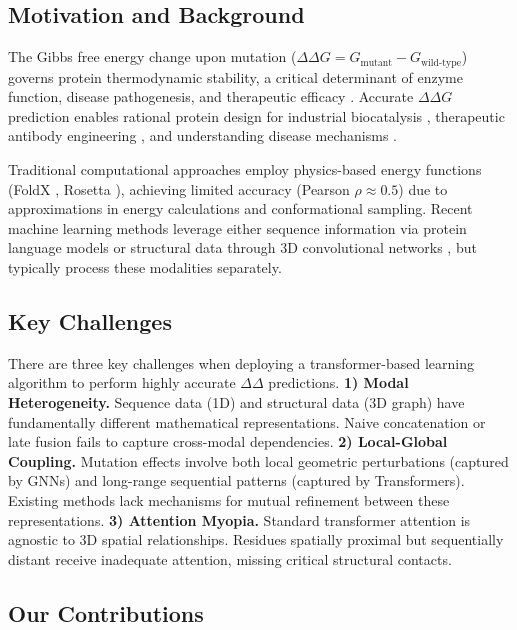\documentclass[11pt]{article}
\begin{document}
\subsection*{Motivation and Background}

The Gibbs free energy change upon mutation ($\Delta\Delta G = G_{\text{mutant}} -
G_{\text{wild-type}}$) governs protein thermodynamic stability, a critical
determinant of enzyme function, disease pathogenesis, and therapeutic efficacy
\cite{tokuriki2009stability}. Accurate $\Delta \Delta G$ prediction enables rational
protein design for industrial biocatalysis \cite{Braun2024,Braun2024.08.02.606416,Listov2025},
therapeutic antibody engineering \cite{Jain2017}, and understanding
disease mechanisms \cite{Yue2005,Bashour2024}.

Traditional computational approaches employ physics-based energy functions
(FoldX \citep{Schymkowitz2005}, Rosetta \citep{Kellogg2011}), achieving
limited accuracy (Pearson $\rho \approx 0.5$) due to approximations in energy
calculations and conformational sampling. Recent machine learning methods
leverage either sequence information via protein language models
\citep{NEURIPS2021_f51338d7} or structural data through 3D convolutional networks
\citep{Zhou2023}, but typically process these modalities separately.

\subsection*{Key Challenges}
There are three key challenges when deploying a transformer-based learning
algorithm to perform highly accurate $\Delta\Delta$ predictions. \textbf{1)
Modal Heterogeneity.} Sequence data (1D) and structural data (3D graph) have
fundamentally different mathematical representations. Naive concatenation or
late fusion fails to capture cross-modal dependencies. \textbf{2) Local-Global
Coupling.} Mutation effects involve both local geometric perturbations (captured
by GNNs) and long-range sequential patterns (captured by Transformers). Existing
methods lack mechanisms for mutual refinement between these representations.
\textbf{3) Attention Myopia.} Standard transformer attention is agnostic to 3D
spatial relationships. Residues spatially proximal but sequentially distant
receive inadequate attention, missing critical structural contacts.

\subsection*{Our Contributions}
\end{document}

